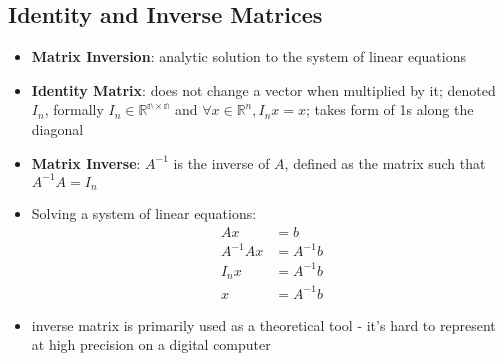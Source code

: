 \subsection{Identity and Inverse Matrices}
\begin{itemize}
    \item \textbf{Matrix Inversion}: analytic solution to the system of linear equations
    \item \textbf{Identity Matrix}: does not change a vector when multiplied by it; denoted $I_n$, formally $I_n \in \mathbb{R^{n \times n}}$ and $\forall x \in \mathbb{R}^n, I_n x = x$; takes form of 1s along the diagonal
    \item \textbf{Matrix Inverse}: $A^{-1}$ is the inverse of $A$, defined as the matrix such that $A^{-1}A = I_n$
    \item Solving a system of linear equations:
    \begin{align}
        Ax &= b \\
        A^{-1}Ax &= A^{-1}b \\
        I_n x &= A^{-1}b \\
        x &= A^{-1}b 
    \end{align}
    \item inverse matrix is primarily used as a theoretical tool - it's hard to represent at high precision on a digital computer
\end{itemize}

